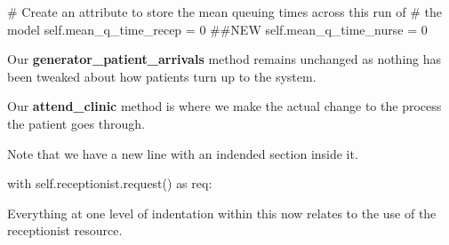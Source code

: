 \documentclass[
  letterpaper,
  DIV=11,
  numbers=noendperiod]{scrreprt}
\newenvironment{Shaded}{\begin{snugshade}}{\end{snugshade}}
\newcommand{\CommentTok}[1]{\textcolor[rgb]{0.37,0.37,0.37}{#1}}
\newcommand{\ControlFlowTok}[1]{\textcolor[rgb]{0.00,0.23,0.31}{#1}}
\newcommand{\DecValTok}[1]{\textcolor[rgb]{0.68,0.00,0.00}{#1}}
\newcommand{\ImportTok}[1]{\textcolor[rgb]{0.00,0.46,0.62}{#1}}
\newcommand{\NormalTok}[1]{\textcolor[rgb]{0.00,0.23,0.31}{#1}}
\newcommand{\OperatorTok}[1]{\textcolor[rgb]{0.37,0.37,0.37}{#1}}
\newcommand{\VariableTok}[1]{\textcolor[rgb]{0.07,0.07,0.07}{#1}}
\begin{document}
\begin{Shaded}
\begin{Highlighting}[]
        \CommentTok{\# Create an attribute to store the mean queuing times across this run of}
        \CommentTok{\# the model}
        \VariableTok{self}\NormalTok{.mean\_q\_time\_recep }\OperatorTok{=} \DecValTok{0} \CommentTok{\#\#NEW}
        \VariableTok{self}\NormalTok{.mean\_q\_time\_nurse }\OperatorTok{=} \DecValTok{0}
\end{Highlighting}
\end{Shaded}

Our \textbf{generator\_patient\_arrivals} method remains unchanged as
nothing has been tweaked about how patients turn up to the system.

Our \textbf{attend\_clinic} method is where we make the actual change to
the process the patient goes through.

Note that we have a new line with an indended section inside it.

\begin{Shaded}
\begin{Highlighting}[]
\ControlFlowTok{with} \VariableTok{self}\NormalTok{.receptionist.request() }\ImportTok{as}\NormalTok{ req:}
\end{Highlighting}
\end{Shaded}

Everything at one level of indentation within this now relates to the
use of the receptionist resource.
\end{document}
